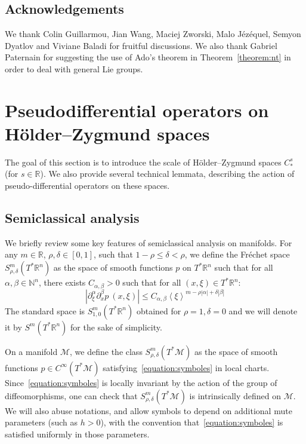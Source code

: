 \documentclass[10pt]{amsart}
\theoremstyle{definition}\newtheorem{defi}[theo]{Definition}\newtheorem{rema}[theo]{Remark}\newtheorem{exam}[theo]{Example}\newtheorem{exem}[theo]{Example}\newtheorem{nota}[theo]{Notation}
\newcommand{\R}{\mathbb{R}}
\newcommand{\N}{\mathbb{N}}
\newcommand{\M}{\mathcal{M}}
\begin{document}
\subsection*{Acknowledgements}
We thank Colin Guillarmou, Jian Wang, Maciej Zworski, Malo Jézéquel, Semyon Dyatlov and Viviane Baladi for fruitful discussions. We also thank Gabriel Paternain for suggesting the use of Ado's theorem in Theorem~\ref{theorem:nt} in order to deal with general Lie groups. 

\section{Pseudodifferential operators on H\"older--Zygmund spaces}
\label{section:pseudo}

The goal of this section is to introduce the scale of H\"older--Zygmund spaces $C^s_*$ (for $s \in \R$). We also provide several technical lemmata, describing the action of pseudo-differential operators on these spaces.

\subsection{Semiclassical analysis}
\label{ssection:analysis}

We briefly review some key features of semiclassical analysis on manifolds. For any $m \in \R$, $\rho,\delta \in [0,1]$, such that $1-\rho \leq \delta < \rho$, we define the Fréchet space $S^m_{\rho,\delta}(T^*\R^n)$ as the space of smooth functions $p$ on $T^*\R^n$ such that for all $\alpha,\beta \in \N^n$, there exists $C_{\alpha,\beta} > 0$ such that for all $(x,\xi) \in T^*\R^n$:
\begin{equation}\label{equation:symboles}
\left|\partial^\alpha_\xi \partial^\beta_x p~(x,\xi)\right| \leq C_{\alpha,\beta} \left\langle \xi \right\rangle^{m-\rho|\alpha|+\delta|\beta|}
\end{equation}
The standard space is $S^m_{1,0}(T^*\R^n)$ obtained for $\rho=1,\delta=0$ and we will denote it by $S^m(T^*\R^n)$ for the sake of simplicity.

On a manifold $\M$, we define the class $S^m_{\rho,\delta}(T^*\M)$ as the space of smooth functions $p \in C^\infty(T^*\M)$ satisfying~\eqref{equation:symboles} in local charts. Since~\eqref{equation:symboles} is locally invariant by the action of the group of diffeomorphisms, one can check that $S^m_{\rho,\delta}(T^*\M)$ is intrinsically defined on $\M$. We will also abuse notations, and allow symbols to depend on additional mute parameters (such as $h>0$), with the convention that~\eqref{equation:symboles} is satisfied uniformly in those parameters.
\end{document}
